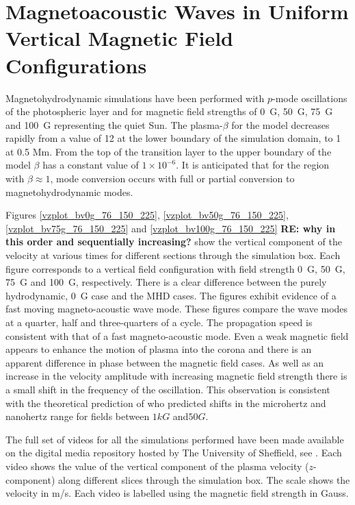 \documentclass{aastex62}
\begin{document}
\section{Magnetoacoustic Waves in Uniform Vertical Magnetic Field Configurations}

Magnetohydrodynamic simulations have been performed with $p$-mode oscillations of the photospheric layer and for magnetic field strengths of 0~G, 50~G, 75~G and 100~G representing the quiet Sun. The plasma-$\beta$ for the model decreases rapidly from a value of 12 at the lower boundary of the simulation domain, to 1 at 0.5 Mm. From the top of the transition layer to the upper boundary of the model $\beta $ has a constant value of $1\times 10^{-6}$. It is anticipated that for the region with $\beta \approx 1$, mode conversion occurs with full or partial conversion to magnetohydrodynamic modes. 

Figures \ref{vzplot_bv0g_76_150_225}, \ref{vzplot_bv50g_76_150_225}, \ref{vzplot_bv75g_76_150_225} and \ref{vzplot_bv100g_76_150_225} {\bf RE: why in this order and sequentially increasing?} show the vertical component of the velocity at various times for different sections through the simulation box. Each figure corresponds to a vertical field configuration with field strength 0~G, 50~G, 75~G and 100~G, respectively. There is a clear difference between the purely hydrodynamic, 0~G case and the MHD cases. The figures exhibit evidence of a fast moving magneto-acoustic wave mode. These figures compare the wave modes at a quarter, half and three-quarters of a cycle. The propagation speed is consistent with that of a fast magneto-acoustic mode. Even a weak magnetic field appears to enhance the motion of plasma into the corona and  there is an apparent difference in phase between the magnetic field cases. As well as an increase in the velocity amplitude with increasing magnetic field strength there is a small shift in the frequency of the oscillation. This observation is consistent with the theoretical prediction of \citet{Hindman1996} who predicted shifts in the microhertz and nanohertz range for fields between $1kG$ and$50G$. 

The full set of videos for all the simulations performed have been made available on the digital media repository hosted by The University of Sheffield, see \citet{Griffiths2018}. Each video shows the value of the vertical component of the plasma velocity ($z$-component) along different slices through the simulation box. The scale shows the velocity in m/s.  Each video is labelled using the magnetic field strength in Gauss.
\end{document}
